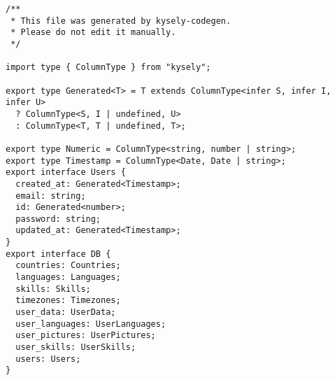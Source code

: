 \begin{verbatim}
/**
 * This file was generated by kysely-codegen.
 * Please do not edit it manually.
 */

import type { ColumnType } from "kysely";

export type Generated<T> = T extends ColumnType<infer S, infer I, infer U>
  ? ColumnType<S, I | undefined, U>
  : ColumnType<T, T | undefined, T>;

export type Numeric = ColumnType<string, number | string>;
export type Timestamp = ColumnType<Date, Date | string>;
export interface Users {
  created_at: Generated<Timestamp>;
  email: string;
  id: Generated<number>;
  password: string;
  updated_at: Generated<Timestamp>;
}
export interface DB {
  countries: Countries;
  languages: Languages;
  skills: Skills;
  timezones: Timezones;
  user_data: UserData;
  user_languages: UserLanguages;
  user_pictures: UserPictures;
  user_skills: UserSkills;
  users: Users;
}
\end{verbatim}